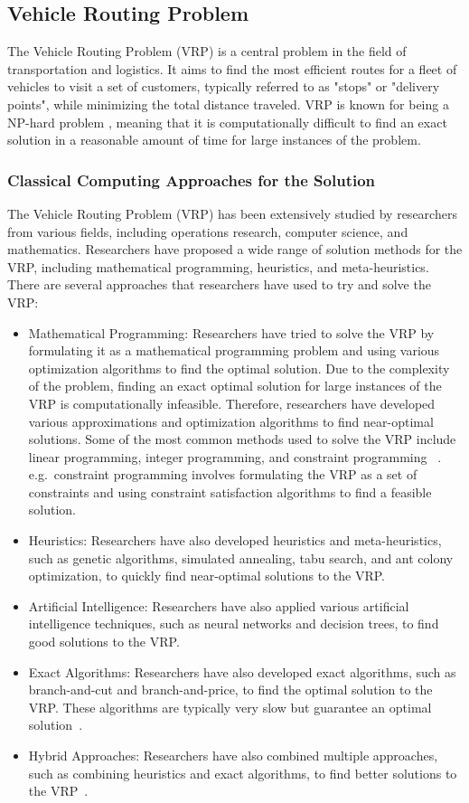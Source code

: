\subsection{Vehicle Routing Problem}\label{subsec:vehicle-routing-problem}

The Vehicle Routing Problem (VRP) is a central problem in the field of transportation and logistics.
It aims to find the most efficient routes for a fleet of vehicles to visit a set of customers,
typically referred to as "stops" or "delivery points", while minimizing the total distance traveled.
VRP is known for being a NP-hard problem \cite{toth2002vehicle}, meaning that it is computationally difficult to find an exact solution
in a reasonable amount of time for large instances of the problem.

\subsubsection{Classical Computing Approaches for the Solution}
The Vehicle Routing Problem (VRP) has been extensively studied by researchers from various fields, including operations research,
computer science, and mathematics. Researchers have proposed a wide range of solution methods for the VRP, including mathematical programming, heuristics,
and meta-heuristics.
There are several approaches that researchers have used to try and solve the VRP:
\begin{itemize}
    \item Mathematical Programming: Researchers have tried to solve the VRP by formulating it as a mathematical programming problem and using various optimization algorithms to find the optimal solution.
    Due to the complexity of the problem, finding an exact optimal solution for large instances of the VRP is computationally infeasible.
    Therefore, researchers have developed various approximations and optimization algorithms to find near-optimal solutions.
    Some of the most common methods used to solve the VRP include linear programming, integer programming, and constraint programming ~\cite{toth2002overview}.
    e.g.\ constraint programming involves formulating the VRP as a set of constraints and using constraint satisfaction algorithms to find a feasible solution.
    \item Heuristics: Researchers have also developed heuristics and meta-heuristics, such as genetic algorithms, simulated annealing, tabu search, and ant colony optimization, to quickly find near-optimal solutions to the VRP.
    \item Artificial Intelligence: Researchers have also applied various artificial intelligence techniques, such as neural networks and decision trees, to find good solutions to the VRP.
    \item Exact Algorithms: Researchers have also developed exact algorithms, such as branch-and-cut and branch-and-price, to find the optimal solution to the VRP. These algorithms are typically very slow but guarantee an optimal solution~\cite{laporte1987exact}.
    \item Hybrid Approaches: Researchers have also combined multiple approaches, such as combining heuristics and exact algorithms, to find better solutions to the VRP~\cite{hifi2014hybrid}.
\end{itemize}
